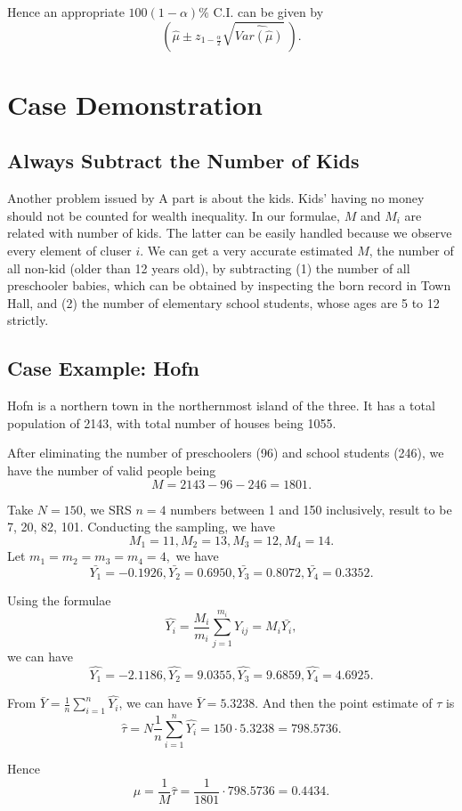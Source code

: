 \documentclass[12pt]{article}%
\begin{document}
Hence an appropriate $100(1-\alpha)\% $ C.I. can be given by 
$$(\hat{\mu} \pm z_{1-\frac{\alpha}{2}} \sqrt{\widehat{Var(\hat{\mu})}}~).$$


\section{Case Demonstration}
\subsection{Always Subtract the Number of Kids}
Another problem issued by A part is about the kids. 
Kids' having no money should not be counted for wealth inequality. 
In our formulae, $M$ and $M_i$ are related with number of kids. 
The latter can be easily handled because 
we observe every element of cluser $i$.
We can get a very accurate estimated $M$, 
the number of all non-kid (older than 12 years old), 
by subtracting (1) the number of all preschooler babies, 
which can be obtained by inspecting the born record in Town Hall, and 
(2) the number of elementary school students, whose ages are 5 to 12 strictly.

\subsection{Case Example: Hofn}
Hofn is a northern town in the northernmost island of the three. 
It has a total population of 2143, with total number of houses being 1055.

After eliminating the number of preschoolers (96) and school students (246), 
we have the number of valid people being $$M=2143-96-246=1801.$$ 

Take $N=150$, we SRS $n=4$ numbers between 1 and 150 inclusively, 
result to be 7, 20, 82, 101.
Conducting the sampling, we have 
$$M_1 = 11, M_2 = 13, M_3 = 12, M_4=14.$$ 
Let $m_1 = m_2 = m_3 = m_4 = 4,$
we have 
$$\bar{Y_1}=-0.1926, \bar{Y_2}=0.6950, 
\bar{Y_3}=0.8072, \bar{Y_4}=0.3352.$$

Using the formulae 
$$\hat{Y_i}=\frac{M_i}{m_i}\sum_{j=1}^{m_i}Y_{ij}=M_i \bar{Y_i},$$ 
we can have 
$$
\hat{Y_1}=-2.1186, \hat{Y_2}=9.0355,
\hat{Y_3}=9.6859, \hat{Y_4}=4.6925.
$$

From $\bar{Y}=\frac{1}{n}\sum_{i=1}^n \hat{Y_i}$, 
we can have $\bar{Y}=5.3238$. 
And then the point estimate of $\tau$ is 
$$\hat{\tau}
= N\frac{1}{n} \sum_{i=1}^n \hat{Y_i} 
= 150\cdot 5.3238=798.5736.$$

Hence $$\hat{\mu}=\frac{1}{M}\hat{\tau}=\frac{1}{1801}\cdot 798.5736=0.4434.$$
\end{document}

